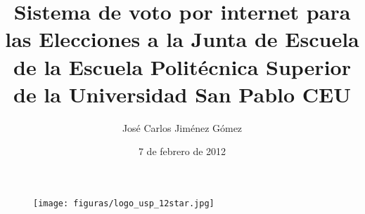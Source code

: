 \documentclass[a4paper,oneside,12pt]{report}
\newif\ifpdf
\begin{document}
\ifpdf
	\DeclareGraphicsExtensions{.pdf,.jpg,.png}
\else
\fi

\pagestyle{fancy} %



\begin{figure}
	\centering
		\texttt{[image: figuras/logo\_usp\_12star.jpg]}
\end{figure}


\title{Sistema de voto por internet para las Elecciones a la Junta de Escuela de la Escuela Politécnica Superior de la Universidad San Pablo CEU}
\author{José Carlos Jiménez Gómez}
\date{7 de febrero de 2012} %

\maketitle










\lhead{}
\tableofcontents %

\clearpage
{}
\listoffigures

\clearpage
\renewcommand{\tablename}{Tabla}
\renewcommand{\listtablename}{Índice de tablas}
\listoftables
\end{document}
